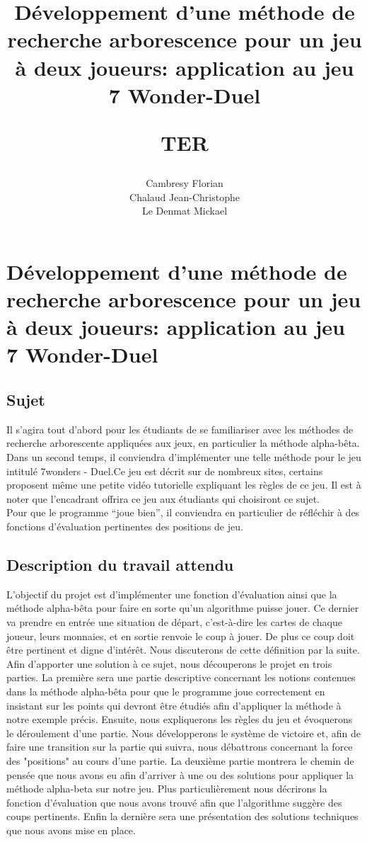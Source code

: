 \documentclass[12pt]{article}
\title{
	\Huge
	\textbf{Développement d'une méthode de recherche arborescence pour un jeu à deux joueurs:
		application au jeu 7 Wonder-Duel}
	\vspace{0.4cm}

	\LARGE
	TER
}
\author{
	Cambresy Florian \\
	Chalaud Jean-Christophe \\
	Le Denmat Mickael
}
\begin{document}
	\newpage
	
    \pagestyle{fancy} 
    \fancyhead[R]{\thepage}
    \fancyhead[C]{}
    \fancyfoot[C]{}
	\newpage
	\renewcommand{\contentsname}{Table des matières}
	\tableofcontents

	\newpage
	\section{Développement d'une méthode de recherche arborescence pour un jeu à deux joueurs:
	application au jeu 7 Wonder-Duel}
	\subsection{Sujet}
    	Il s’agira tout d’abord pour les étudiants de se familiariser avec les méthodes de recherche arborescente appliquées aux jeux, en particulier la méthode alpha-bêta. \\
    	Dans un second temps, il conviendra d'implémenter une telle méthode pour le jeu intitulé 7wonders - Duel.Ce jeu est décrit sur de nombreux sites, certains proposent même une petite vidéo tutorielle expliquant les règles de ce jeu. Il est à noter que l’encadrant offrira ce jeu aux étudiants qui
    	choisiront ce sujet. \\
    	Pour que le programme “joue bien”, il conviendra en particulier de réfléchir à des fonctions d'évaluation pertinentes des positions de jeu.

	\subsection{Description du travail attendu}
    	L'objectif du projet est d'implémenter une fonction d'évaluation ainsi que la méthode alpha-bêta pour faire en sorte qu'un algorithme puisse jouer. Ce dernier va prendre en entrée une situation de départ, c'est-à-dire les cartes de chaque joueur, leurs monnaies, et en sortie renvoie le coup à jouer. De plus ce coup doit être pertinent et digne d'intérêt. Nous discuterons de cette définition par la suite. Afin d'apporter une solution à ce sujet, nous découperons le projet en trois parties.
    	La première sera une partie descriptive concernant les notions contenues dans la méthode alpha-bêta pour que le programme joue correctement en insistant sur les points qui devront être étudiés afin d'appliquer la méthode à notre exemple précis. Ensuite, nous expliquerons les règles du jeu et évoquerons le déroulement d'une partie. Nous développerons le système de victoire et, afin de faire une transition sur la partie qui suivra, nous débattrons concernant la force des "positions" au cours d'une partie. La deuxième partie montrera le chemin de pensée que nous avons eu afin d'arriver à une ou des solutions pour appliquer la méthode alpha-beta sur notre jeu. Plus particulièrement nous décrirons la fonction d'évaluation que nous avons trouvé afin que l'algorithme suggère des coups pertinents. Enfin la dernière sera une présentation des solutions techniques que nous avons mise en place.
\end{document}
